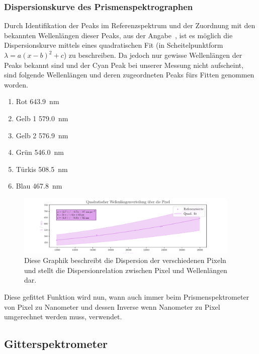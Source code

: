 \documentclass[12pt,english,ngerman]{scrartcl}
\begin{document}
\subsubsection{Dispersionskurve des Prismenspektrographen}\label{sec:DispersionPrism}

Durch Identifikation der Peaks im Referenzspektrum und der Zuordnung mit den
bekannten Wellenlängen dieser Peaks, aus der
Angabe~\cite{noauthor_spectrograph_2016}, ist es möglich die Dispersionskurve
mittels eines quadratischen Fit (in Scheitelpunktform $\lambda = a (x-b)^2 +
	c$) zu beschreiben. Da jedoch nur gewisse Wellenlängen der Peaks bekannt sind
und der Cyan Peak bei unserer Messung nicht aufscheint, sind folgende
Wellenlängen und deren zugeordneten Peaks fürs Fitten genommen worden.

\begin{enumerate}
	\item Rot \SI{643.9}{\nano\meter}
	\item Gelb 1 \SI{579.0}{\nano\meter}
	\item Gelb 2 \SI{576.9}{\nano\meter}
	\item Grün \SI{546.0}{\nano\meter}
	\item Türkis \SI{508.5}{\nano\meter}
	\item Blau \SI{467.8}{\nano\meter}
\end{enumerate}

\begin{figure}[H]
	\begin{center}
		\includegraphics[width=0.95\textwidth]{figures/mappingPxToWaveLength.pdf}
	\end{center}
	\caption{Diese Graphik beschreibt die Dispersion der verschiedenen Pixeln
		und stellt die Dispersionrelation zwischen Pixel und Wellenlängen dar.
	}\label{fig:dispersionkurve}
\end{figure}

Diese gefittet Funktion wird nun, wann auch immer beim Prismenspektrometer von
Pixel zu Nanometer und dessen Inverse wenn Nanometer zu Pixel umgerechnet
werden muss, verwendet.

\subsection{Gitterspektrometer}
\end{document}
